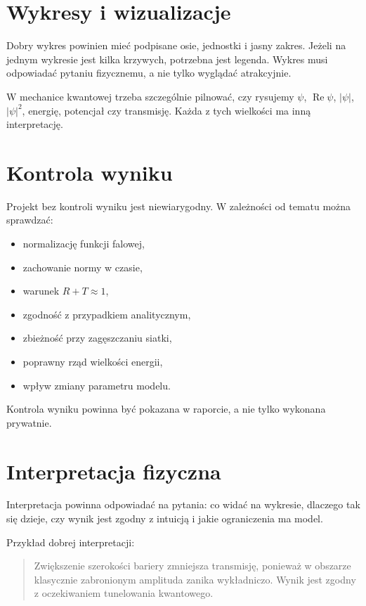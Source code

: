 \section{Wykresy i wizualizacje}

Dobry wykres powinien mieć podpisane osie, jednostki i jasny zakres. Jeżeli na
jednym wykresie jest kilka krzywych, potrzebna jest legenda. Wykres musi
odpowiadać pytaniu fizycznemu, a nie tylko wyglądać atrakcyjnie.

W mechanice kwantowej trzeba szczególnie pilnować, czy rysujemy
\(\psi\), \(\operatorname{Re}\psi\), \(|\psi|\), \(|\psi|^2\), energię,
potencjał czy transmisję. Każda z tych wielkości ma inną interpretację.

\section{Kontrola wyniku}

Projekt bez kontroli wyniku jest niewiarygodny. W zależności od tematu można
sprawdzać:
\begin{itemize}
    \item normalizację funkcji falowej,
    \item zachowanie normy w czasie,
    \item warunek \(R+T\approx1\),
    \item zgodność z przypadkiem analitycznym,
    \item zbieżność przy zagęszczaniu siatki,
    \item poprawny rząd wielkości energii,
    \item wpływ zmiany parametru modelu.
\end{itemize}

Kontrola wyniku powinna być pokazana w raporcie, a nie tylko wykonana prywatnie.

\section{Interpretacja fizyczna}

Interpretacja powinna odpowiadać na pytania: co widać na wykresie, dlaczego tak
się dzieje, czy wynik jest zgodny z intuicją i jakie ograniczenia ma model.

Przykład dobrej interpretacji:
\begin{quote}
Zwiększenie szerokości bariery zmniejsza transmisję, ponieważ w obszarze
klasycznie zabronionym amplituda zanika wykładniczo. Wynik jest zgodny z
oczekiwaniem tunelowania kwantowego.
\end{quote}

